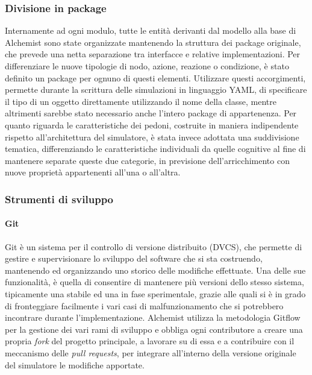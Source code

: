 \subsubsection{Divisione in package}
Internamente ad ogni modulo, tutte le entità derivanti dal modello alla base di Alchemist sono state organizzate mantenendo la struttura dei package originale, che prevede una netta separazione tra interfacce e relative implementazioni. Per differenziare le nuove tipologie di nodo, azione, reazione o condizione, è stato definito un package per ognuno di questi elementi. \newline
Utilizzare questi accorgimenti, permette durante la scrittura delle simulazioni in linguaggio YAML, di specificare il tipo di un oggetto direttamente utilizzando il nome della classe, mentre altrimenti sarebbe stato necessario anche l'intero package di appartenenza. \newline
Per quanto riguarda le caratteristiche dei pedoni, costruite in maniera indipendente rispetto all'architettura del simulatore, è stata invece adottata una suddivisione tematica, differenziando le caratteristiche individuali da quelle cognitive al fine di mantenere separate queste due categorie, in previsione dell'arricchimento con nuove proprietà appartenenti all'una o all'altra.

\subsubsection{Strumenti di sviluppo}

\paragraph{Git}
Git è un sistema per il controllo di versione distribuito (DVCS), che permette di gestire e supervisionare lo sviluppo del software che si sta costruendo, mantenendo ed organizzando uno storico delle modifiche effettuate. Una delle sue funzionalità, è quella di consentire di mantenere più versioni dello stesso sistema, tipicamente una stabile ed una in fase sperimentale, grazie alle quali si è in grado di fronteggiare facilmente i vari casi di malfunzionamento che si potrebbero incontrare durante l'implementazione. \newline
Alchemist utilizza la metodologia Gitflow per la gestione dei vari rami di sviluppo e obbliga ogni contributore a creare una propria \textit{fork} del progetto principale, a lavorare su di essa e a contribuire con il meccanismo delle \textit{pull requests}, per integrare all'interno della versione originale del simulatore le modifiche apportate.

